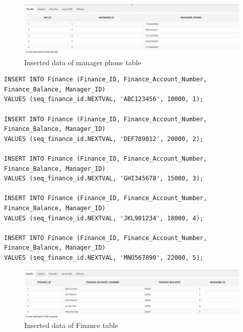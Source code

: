 \begin{figure}[H]
    \centering
    \includegraphics[width=1\textwidth]{images/TableData/MANAGER_PHONE.png}
    \caption{Inserted data of manager phone table}
\end{figure}


\begin{lstlisting}[caption={Inserting data into Finance tables},label={lst:insert_Finance}]
INSERT INTO Finance (Finance_ID, Finance_Account_Number, Finance_Balance, Manager_ID)
VALUES (seq_finance_id.NEXTVAL, 'ABC123456', 10000, 1);

INSERT INTO Finance (Finance_ID, Finance_Account_Number, Finance_Balance, Manager_ID)
VALUES (seq_finance_id.NEXTVAL, 'DEF789012', 20000, 2);

INSERT INTO Finance (Finance_ID, Finance_Account_Number, Finance_Balance, Manager_ID)
VALUES (seq_finance_id.NEXTVAL, 'GHI345678', 15000, 3);

INSERT INTO Finance (Finance_ID, Finance_Account_Number, Finance_Balance, Manager_ID)
VALUES (seq_finance_id.NEXTVAL, 'JKL901234', 18000, 4);

INSERT INTO Finance (Finance_ID, Finance_Account_Number, Finance_Balance, Manager_ID)
VALUES (seq_finance_id.NEXTVAL, 'MNO567890', 22000, 5);
\end{lstlisting}
\begin{figure}[H]
    \centering
    \includegraphics[width=1\textwidth]{images/TableData/FINANCE.png}
    \caption{Inserted data of Finance table}
\end{figure}

